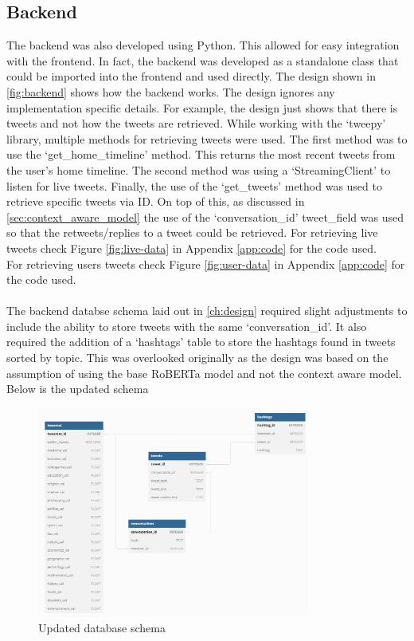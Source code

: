 \subsection{Backend}
The backend was also developed using Python. This allowed for easy integration with the frontend. In fact, the backend was developed as a standalone
class that could be imported into the frontend and used directly. The design shown in \cref{fig:backend} shows how the backend works. The design
ignores any implementation specific details. For example, the design just shows that there is tweets and not how the tweets are retrieved.
While working with the `tweepy' library, multiple methods for retrieving tweets were used. The first method was to use the `get\_home\_timeline'
method. This returns the most recent tweets from the user's home timeline. The second method was using a `StreamingClient' to listen for
live tweets. Finally, the use of the `get\_tweets' method was used to retrieve specific tweets via ID. On top of this, as discussed in \cref{sec:context_aware_model}
the use of the `conversation\_id' tweet\_field was used so that the retweets/replies to a tweet could be retrieved.
For retrieving live tweets check Figure \ref{fig:live-data} in Appendix \ref{app:code} for the code used.\\
For retrieving users tweets check Figure \ref{fig:user-data} in Appendix \ref{app:code} for the code used.\\\\
The backend databse schema laid out in \cref{ch:design} required slight adjustments to include the ability to store tweets with the same `conversation\_id'.
It also required the addition of a `hashtags' table to store the hashtags found in tweets sorted by topic.
This was overlooked originally as the design was based on the assumption of using the base RoBERTa model and not the context aware model.
Below is the updated schema
\begin{figure}[h]
    \centering
    \includegraphics[width=0.8\textwidth]{../images/updated-schema.png}
    \caption{Updated database schema}
    \label{fig:updated-schema}
\end{figure}

